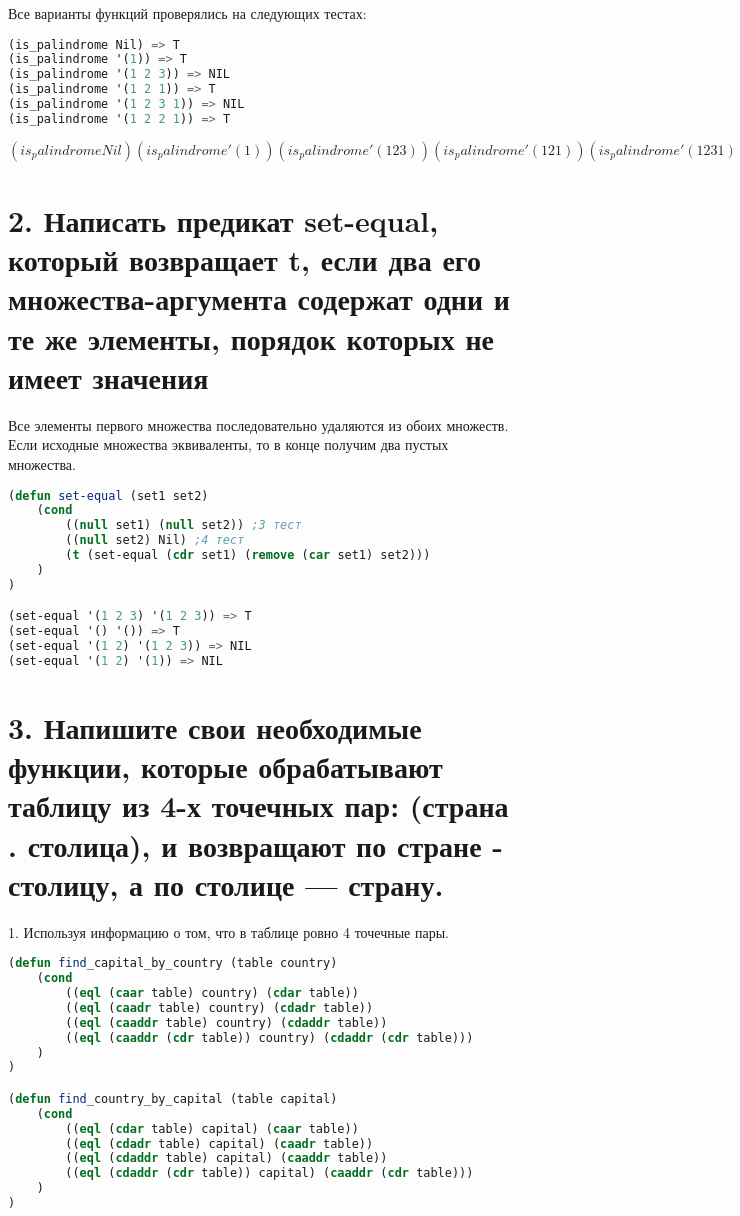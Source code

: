 \documentclass[12pt]{report}
\begin{document}
Все варианты функций проверялись на следующих тестах:
\begin{lstlisting}[language=Lisp]
(is_palindrome Nil) => T
(is_palindrome '(1)) => T
(is_palindrome '(1 2 3)) => NIL
(is_palindrome '(1 2 1)) => T
(is_palindrome '(1 2 3 1)) => NIL
(is_palindrome '(1 2 2 1)) => T
\end{lstlisting}

$
(is_palindrome Nil)
(is_palindrome '(1))
(is_palindrome '(1 2 3))
(is_palindrome '(1 2 1))
(is_palindrome '(1 2 3 1))
(is_palindrome '(1 2 2 1))
$
\fi



\clearpage
\section*{2. Написать предикат set-equal, который возвращает t, если два его множества-аргумента содержат одни и те же элементы, порядок которых не имеет значения}

Все элементы первого множества последовательно удаляются из обоих множеств. Если исходные множества эквиваленты, то в конце получим два пустых множества.

\begin{lstlisting}[language=Lisp]
(defun set-equal (set1 set2)
	(cond 
		((null set1) (null set2)) ;3 тест
		((null set2) Nil) ;4 тест
		(t (set-equal (cdr set1) (remove (car set1) set2)))
	)
)

(set-equal '(1 2 3) '(1 2 3)) => T
(set-equal '() '()) => T
(set-equal '(1 2) '(1 2 3)) => NIL
(set-equal '(1 2) '(1)) => NIL
\end{lstlisting}




\section*{3. Напишите свои необходимые функции, которые обрабатывают таблицу из 4-х точечных пар: (страна . столица), и возвращают по стране - столицу, а по столице — страну.}

1. Используя информацию о том, что в таблице ровно 4 точечные пары.

\begin{lstlisting}[language=Lisp]
(defun find_capital_by_country (table country)
	(cond
		((eql (caar table) country) (cdar table))
		((eql (caadr table) country) (cdadr table))
		((eql (caaddr table) country) (cdaddr table))
		((eql (caaddr (cdr table)) country) (cdaddr (cdr table)))
	)
)

(defun find_country_by_capital (table capital)
	(cond
		((eql (cdar table) capital) (caar table))
		((eql (cdadr table) capital) (caadr table))
		((eql (cdaddr table) capital) (caaddr table))
		((eql (cdaddr (cdr table)) capital) (caaddr (cdr table)))
	)
)
\end{lstlisting}
\end{document}
